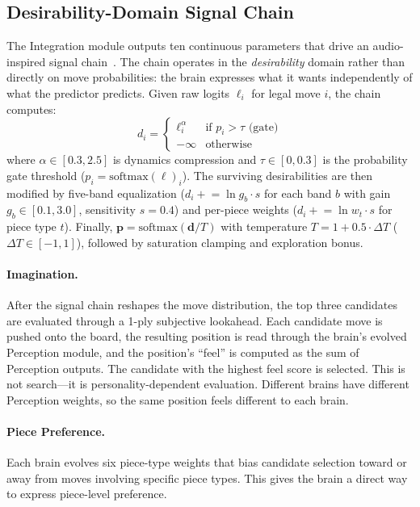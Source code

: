 \documentclass[11pt,a4paper]{article}
\begin{document}
\subsection{Desirability-Domain Signal Chain}

The Integration module outputs ten continuous parameters that drive an audio-inspired signal chain~\citep{resendez2026ailed}.
The chain operates in the \emph{desirability} domain rather than directly on move probabilities: the brain expresses what it wants independently of what the predictor predicts.
Given raw logits $\ell_i$ for legal move $i$, the chain computes:
\begin{equation}
    d_i = \begin{cases} \ell_i^\alpha & \text{if } p_i > \tau \text{ (gate)} \\ -\infty & \text{otherwise} \end{cases}
    \label{eq:desirability}
\end{equation}
where $\alpha \in [0.3, 2.5]$ is dynamics compression and $\tau \in [0, 0.3]$ is the probability gate threshold ($p_i = \text{softmax}(\ell)_i$).
The surviving desirabilities are then modified by five-band equalization ($d_i \mathrel{+}= \ln g_b \cdot s$ for each band $b$ with gain $g_b \in [0.1, 3.0]$, sensitivity $s = 0.4$) and per-piece weights ($d_i \mathrel{+}= \ln w_t \cdot s$ for piece type $t$).
Finally, $\mathbf{p} = \text{softmax}(\mathbf{d} / T)$ with temperature $T = 1 + 0.5 \cdot \Delta T$ ($\Delta T \in [-1, 1]$), followed by saturation clamping and exploration bonus.

\paragraph{Imagination.}
After the signal chain reshapes the move distribution, the top three candidates are evaluated through a 1-ply subjective lookahead.
Each candidate move is pushed onto the board, the resulting position is read through the brain's evolved Perception module, and the position's ``feel'' is computed as the sum of Perception outputs.
The candidate with the highest feel score is selected.
This is not search---it is personality-dependent evaluation.
Different brains have different Perception weights, so the same position feels different to each brain.

\paragraph{Piece Preference.}
Each brain evolves six piece-type weights that bias candidate selection toward or away from moves involving specific piece types.
This gives the brain a direct way to express piece-level preference.
\end{document}
